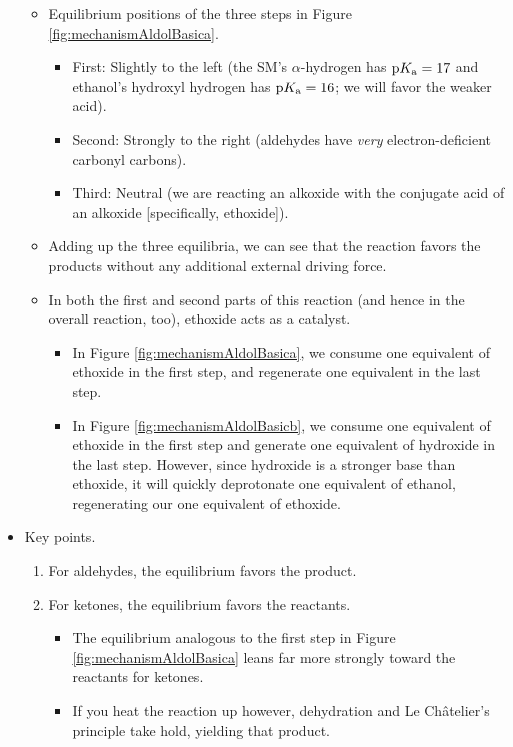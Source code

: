 \documentclass[../notes.tex]{subfiles}
\begin{document}
\begin{itemize}
\begin{itemize}
\begin{itemize}
        \end{itemize}
        \item Equilibrium positions of the three steps in Figure \ref{fig:mechanismAldolBasica}.
        \begin{itemize}
            \item First: Slightly to the left (the SM's $\alpha$-hydrogen has $\text{p}K_\text{a}=17$ and ethanol's hydroxyl hydrogen has $\text{p}K_\text{a}=16$; we will favor the weaker acid).
            \item Second: Strongly to the right (aldehydes have \emph{very} electron-deficient carbonyl carbons).
            \item Third: Neutral (we are reacting an alkoxide with the conjugate acid of an alkoxide [specifically, ethoxide]).
        \end{itemize}
        \item Adding up the three equilibria, we can see that the reaction favors the products without any additional external driving force.
        \item In both the first and second parts of this reaction (and hence in the overall reaction, too), ethoxide acts as a catalyst.
        \begin{itemize}
            \item In Figure \ref{fig:mechanismAldolBasica}, we consume one equivalent of ethoxide in the first step, and regenerate one equivalent in the last step.
            \item In Figure \ref{fig:mechanismAldolBasicb}, we consume one equivalent of ethoxide in the first step and generate one equivalent of hydroxide in the last step. However, since hydroxide is a stronger base than ethoxide, it will quickly deprotonate one equivalent of ethanol, regenerating our one equivalent of ethoxide.
        \end{itemize}
    \end{itemize}
    \item Key points.
    \begin{enumerate}
        \item For aldehydes, the equilibrium favors the product.
        \item For ketones, the equilibrium favors the reactants.
        \begin{itemize}
            \item The equilibrium analogous to the first step in Figure \ref{fig:mechanismAldolBasica} leans far more strongly toward the reactants for ketones.
            \item If you heat the reaction up however, dehydration and Le Ch\^{a}telier's principle take hold, yielding that product.

\end{itemize}
\end{enumerate}
\end{itemize}
\end{document}
